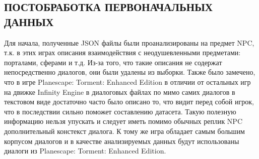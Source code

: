 \subsection{ПОСТОБРАБОТКА ПЕРВОНАЧАЛЬНЫХ ДАННЫХ}

Для начала, полученные JSON файлы были проанализированы на предмет NPC, т.к. в этих играх описания взаимодействия с неодушевленными предметами: порталами, сферами и т.д. Из-за того, что такие описания не содержат непосредственно диалогов, они были удалены из выборки. Также было замечено, что в игре Planescape: Torment: Enhanced Edition в отличии от остальных игр на движке Infinity Engine в диалоговых файлах по мимо самих диалогов в текстовом виде достаточно часто было описано то, что видит перед собой игрок, что в последствии сильно поможет составлению датасета. Такую полезную информацию нельзя упускать и следует иметь помимо обычных реплик NPC дополнительный констекст диалога. К тому же игра обладает самым большим корпусом диалогов и в качестве анализируемых данных будут использованы диалоги из Planescape: Torment: Enhanced Edition.